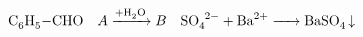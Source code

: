 \documentclass[10pt]{book}
\begin{document}
\begin{mdSnippets}
\begin{mdDisplaySnippet}[34d6c2c3f8f56454e306a51ccd153b33]%
\begin{mdDiv}[class={math,math-display},color={},math-needpdf={}]%
\[%
\ce{C6H5-CHO}\quad
\ce{$A$ ->[\ce{+H2O}] $B$}\quad
\ce{SO4^2- + Ba^2+ -> BaSO4 v}\]%
\end{mdDiv}%


\end{mdDisplaySnippet}
\end{mdSnippets}
\end{document}
